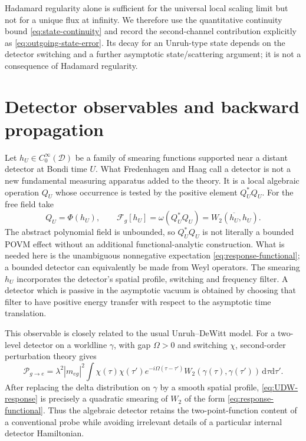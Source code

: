 \documentclass[11pt,a4paper]{article}
\theoremstyle{definition}
\theoremstyle{remark}
\newcommand{\D}{\mathcal D}
\newcommand{\Cinf}{C_0^\infty}
\newcommand{\dd}{\mathrm d}
\begin{document}
	Hadamard regularity alone is sufficient for the universal local scaling limit
	but not for a unique flux at infinity.  We therefore use the quantitative
	continuity bound \eqref{eq:state-continuity} and record the second-channel
	contribution explicitly as \eqref{eq:outgoing-state-error}.  Its decay for an
	Unruh-type state depends on the detector switching and a further asymptotic
	state/scattering argument; it is not a consequence of Hadamard regularity.
	
	\section{Detector observables and backward propagation}
	\label{sec:detectors}
	
	Let $h_U\in\Cinf(\D)$ be a family of smearing functions supported near a
	distant detector at Bondi time $U$.  What Fredenhagen and Haag call a detector
	is not a new fundamental measuring apparatus added to the theory.  It is a
	local algebraic operation $Q_U$ whose occurrence is tested by the positive
	element $Q_U^*Q_U$.  For the free field take
	\begin{equation}
		Q_U=\Phi(h_U),
		\qquad
		\mathcal F_g[h_U]=\omega(Q_U^*Q_U)
		=W_2(\overline{h_U},h_U).
		\label{eq:response-functional}
	\end{equation}
	The abstract polynomial field is unbounded, so $Q_U^*Q_U$ is not literally a
	bounded POVM effect without an additional functional-analytic construction.
	What is needed here is the unambiguous nonnegative expectation
	\eqref{eq:response-functional}; a bounded detector can equivalently be made
	from Weyl operators.  The smearing $h_U$ incorporates the detector's spatial
	profile, switching and frequency filter.  A detector which is passive in the
	asymptotic vacuum is obtained by choosing that filter to have positive energy
	transfer with respect to the asymptotic time translation.
	
	This observable is closely related to the usual Unruh--DeWitt model.  For a
	two-level detector on a worldline $\gamma$, with gap $\Omega>0$ and switching
	$\chi$, second-order perturbation theory gives
	\begin{equation}
		\mathcal P_{g\to e}
		=\lambda^2|m_{eg}|^2
		\int\chi(\tau)\chi(\tau')e^{-i\Omega(\tau-\tau')}
		W_2(\gamma(\tau),\gamma(\tau'))\,\dd\tau\dd\tau'.
		\label{eq:UDW-response}
	\end{equation}
	After replacing the delta distribution on $\gamma$ by a smooth spatial
	profile, \eqref{eq:UDW-response} is precisely a quadratic smearing of $W_2$
	of the form \eqref{eq:response-functional}.  Thus the algebraic detector
	retains the two-point-function content of a conventional probe while avoiding
	irrelevant details of a particular internal detector Hamiltonian.
	
\end{document}
